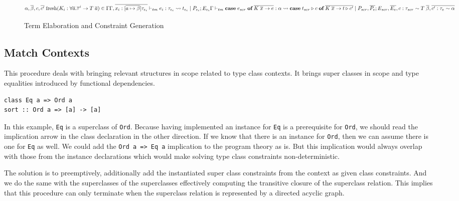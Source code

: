 \begin{figure}[h]
$${    \\
    \alpha, \overline{\beta}, c, \overline{c'} \; \text{fresh}
    \\
    (K_i : \forall \overline{a}. \overline{\tau}^i \rightarrow T \; \overline{a})
    \in \Gamma
    \\
    \Gamma, \overline{x_i : [\overline{a \mapsto \beta}]\tau_{e_i}} \vdash_{tm} e_i
    : \tau_{e_i} \rightsquigarrow t_{e_i} \mid P_{e_i}; E_{e_i}
}
{
    \Gamma \vdash_{tm} \textbf{case} \; e_{scr} \; \textbf{of} \; \overline{K \;
    \overline{x} \rightarrow e} : \alpha \rightsquigarrow \textbf{case} \;
    t_{scr} \triangleright c \; \textbf{of} \; \overline{K \; \overline{x} \rightarrow t
    \triangleright c'} \\
    \mid P_{scr}, \overline{P_e}; E_{scr}, \overline{E_e}, c : \tau_{scr} \sim T
    \; \overline{\beta}, \overline{c' : \tau_e \sim \alpha}
}
$$
\caption{Term Elaboration and Constraint Generation}
\end{figure}

\subsection{Match Contexts}

This procedure deals with bringing relevant structures in scope related
to type class contexts. It brings super classes in scope and type equalities
introduced by functional dependencies.
\begin{verbatim}
class Eq a => Ord a
sort :: Ord a => [a] -> [a]
\end{verbatim}
In this example, \texttt{Eq} is a superclass of \texttt{Ord}. Because having
implemented an instance for \texttt{Eq} is a prerequisite for \texttt{Ord}, we
should read the implication arrow in the class declaration in the other
direction. If we know that there is an instance for \texttt{Ord}, then we can
assume there is one for \texttt{Eq} as well. We could add the \texttt{Ord a =>
Eq a} implication to the program theory as is. But this implication would
always overlap with those from the instance declarations which would make
solving type class constraints non-deterministic.

The solution is to preemptively, additionally add the instantiated super class
constraints from the context as given class constraints. And we do the same with
the superclasses of the superclasses effectively computing the transitive
closure of the superclass relation. This implies that this procedure can only
terminate when the superclass relation is represented by a directed acyclic
graph.


